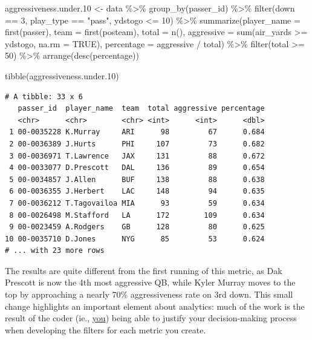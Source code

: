 \documentclass[
  letterpaper,
]{krantz}
\newenvironment{Shaded}{\begin{snugshade}}{\end{snugshade}}
\newcommand{\AttributeTok}[1]{\textcolor[rgb]{0.40,0.45,0.13}{#1}}
\newcommand{\ConstantTok}[1]{\textcolor[rgb]{0.56,0.35,0.01}{#1}}
\newcommand{\DecValTok}[1]{\textcolor[rgb]{0.68,0.00,0.00}{#1}}
\newcommand{\FloatTok}[1]{\textcolor[rgb]{0.68,0.00,0.00}{#1}}
\newcommand{\FunctionTok}[1]{\textcolor[rgb]{0.28,0.35,0.67}{#1}}
\newcommand{\NormalTok}[1]{\textcolor[rgb]{0.00,0.23,0.31}{#1}}
\newcommand{\OtherTok}[1]{\textcolor[rgb]{0.00,0.23,0.31}{#1}}
\newcommand{\SpecialCharTok}[1]{\textcolor[rgb]{0.37,0.37,0.37}{#1}}
\newcommand{\StringTok}[1]{\textcolor[rgb]{0.13,0.47,0.30}{#1}}
\begin{document}
\begin{Shaded}
\begin{Highlighting}[]
\NormalTok{aggressiveness.under}\FloatTok{.10} \OtherTok{\textless{}{-}}\NormalTok{ data }\SpecialCharTok{\%\textgreater{}\%}
  \FunctionTok{group\_by}\NormalTok{(passer\_id) }\SpecialCharTok{\%\textgreater{}\%}
  \FunctionTok{filter}\NormalTok{(down }\SpecialCharTok{==} \DecValTok{3}\NormalTok{, play\_type }\SpecialCharTok{==} \StringTok{"pass"}\NormalTok{, ydstogo }\SpecialCharTok{\textless{}=} \DecValTok{10}\NormalTok{) }\SpecialCharTok{\%\textgreater{}\%}
  \FunctionTok{summarize}\NormalTok{(}\AttributeTok{player\_name =} \FunctionTok{first}\NormalTok{(passer),}
            \AttributeTok{team =} \FunctionTok{first}\NormalTok{(posteam),}
            \AttributeTok{total =} \FunctionTok{n}\NormalTok{(),}
            \AttributeTok{aggressive =} \FunctionTok{sum}\NormalTok{(air\_yards }\SpecialCharTok{\textgreater{}=}\NormalTok{ ydstogo, }\AttributeTok{na.rm =} \ConstantTok{TRUE}\NormalTok{),}
            \AttributeTok{percentage =}\NormalTok{ aggressive }\SpecialCharTok{/}\NormalTok{ total) }\SpecialCharTok{\%\textgreater{}\%}
  \FunctionTok{filter}\NormalTok{(total }\SpecialCharTok{\textgreater{}=} \DecValTok{50}\NormalTok{) }\SpecialCharTok{\%\textgreater{}\%}
  \FunctionTok{arrange}\NormalTok{(}\FunctionTok{desc}\NormalTok{(percentage))}

\FunctionTok{tibble}\NormalTok{(aggressiveness.under}\FloatTok{.10}\NormalTok{)}
\end{Highlighting}
\end{Shaded}

\begin{verbatim}
# A tibble: 33 x 6
   passer_id  player_name  team  total aggressive percentage
   <chr>      <chr>        <chr> <int>      <int>      <dbl>
 1 00-0035228 K.Murray     ARI      98         67      0.684
 2 00-0036389 J.Hurts      PHI     107         73      0.682
 3 00-0036971 T.Lawrence   JAX     131         88      0.672
 4 00-0033077 D.Prescott   DAL     136         89      0.654
 5 00-0034857 J.Allen      BUF     138         88      0.638
 6 00-0036355 J.Herbert    LAC     148         94      0.635
 7 00-0036212 T.Tagovailoa MIA      93         59      0.634
 8 00-0026498 M.Stafford   LA      172        109      0.634
 9 00-0023459 A.Rodgers    GB      128         80      0.625
10 00-0035710 D.Jones      NYG      85         53      0.624
# ... with 23 more rows
\end{verbatim}

The results are quite different from the first running of this metric,
as Dak Prescott is now the 4th most aggressive QB, while Kyler Murray
moves to the top by approaching a nearly 70\% aggressiveness rate on 3rd
down. This small change highlights an important element about analytics:
much of the work is the result of the coder (ie., \uline{you}) being
able to justify your decision-making process when developing the filters
for each metric you create.
\end{document}
